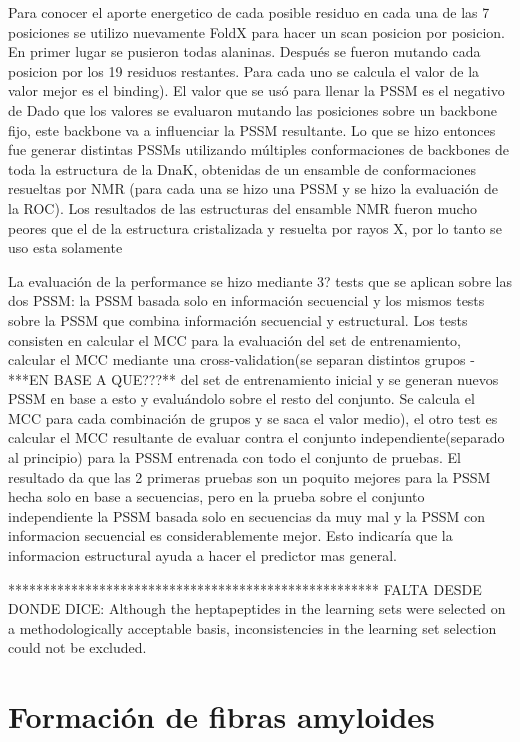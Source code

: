 Para conocer el aporte energetico de cada posible residuo en cada una de las 7
posiciones se utilizo nuevamente FoldX para hacer un scan posicion por posicion.
En primer lugar se pusieron todas alaninas. Después se fueron mutando cada
posicion por los 19 residuos restantes. Para cada uno se calcula el valor de la 
valor mejor es el binding). El valor que se usó para llenar la PSSM es el negativo de 
Dado que los valores se evaluaron mutando las posiciones sobre un backbone fijo,
este backbone va a influenciar la PSSM resultante. Lo que se hizo entonces fue
generar distintas PSSMs utilizando múltiples conformaciones de backbones de 
toda la estructura de la DnaK, obtenidas de un ensamble de conformaciones 
resueltas por NMR (para cada una se hizo una PSSM y se hizo la evaluación de 
la ROC). Los resultados de las estructuras del ensamble NMR fueron mucho peores
que el de la estructura cristalizada y resuelta por rayos X, por lo tanto se uso esta
solamente


La evaluación de la performance se hizo mediante 3? tests que se aplican sobre las dos PSSM: la PSSM basada solo en información secuencial y los mismos tests sobre la PSSM que combina información secuencial y estructural. Los tests consisten en calcular el MCC para la evaluación del set de entrenamiento, calcular el MCC mediante una cross-validation(se separan distintos grupos -***EN BASE A QUE???** del set de entrenamiento inicial y se generan nuevos PSSM en base a esto y evaluándolo sobre el resto del conjunto. Se calcula el MCC para cada combinación de grupos y se saca el valor medio), el otro test es calcular el MCC resultante de evaluar contra el conjunto independiente(separado al principio) para la PSSM entrenada con todo el conjunto de pruebas.
El resultado da que las 2 primeras pruebas son un poquito mejores para la PSSM hecha solo en base a secuencias, pero en la prueba sobre el conjunto independiente la PSSM basada solo en secuencias da muy mal y la PSSM con informacion secuencial es considerablemente mejor. Esto indicaría que la informacion estructural ayuda a hacer el predictor mas general.


*****************************************************
FALTA DESDE DONDE DICE:  Although the heptapeptides in the learning sets were selected on a methodologically acceptable basis, inconsistencies in the learning set selection could not be excluded.


\section{Formación de fibras amyloides}

